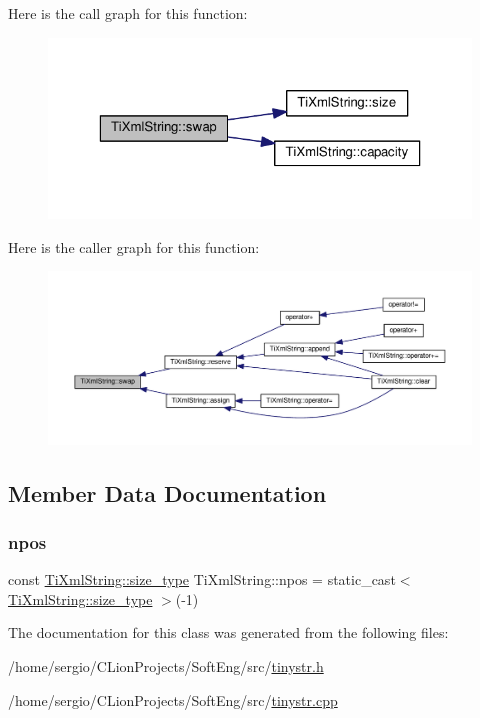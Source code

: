Here is the call graph for this function\+:
\nopagebreak
\begin{figure}[H]
\begin{center}
\leavevmode
\includegraphics[width=323pt]{class_ti_xml_string_aa392cbc180752a79f007f4f9280c7762_cgraph}
\end{center}
\end{figure}
Here is the caller graph for this function\+:
\nopagebreak
\begin{figure}[H]
\begin{center}
\leavevmode
\includegraphics[width=350pt]{class_ti_xml_string_aa392cbc180752a79f007f4f9280c7762_icgraph}
\end{center}
\end{figure}


\subsection{Member Data Documentation}
\mbox{\label{class_ti_xml_string_a8f4422d227088dc7bec96f479b275d0a}} 
\subsubsection{\texorpdfstring{npos}{npos}}
{\footnotesize\ttfamily const \hyperlink{class_ti_xml_string_abeb2c1893a04c17904f7c06546d0b971}{Ti\+Xml\+String\+::size\+\_\+type} Ti\+Xml\+String\+::npos = static\+\_\+cast$<$ \hyperlink{class_ti_xml_string_abeb2c1893a04c17904f7c06546d0b971}{Ti\+Xml\+String\+::size\+\_\+type} $>$(-\/1)\hspace{0.3cm}{\ttfamily [static]}}



The documentation for this class was generated from the following files\+:\begin{DoxyCompactItemize}
\item 
/home/sergio/\+C\+Lion\+Projects/\+Soft\+Eng/src/\hyperlink{tinystr_8h}{tinystr.\+h}\item 
/home/sergio/\+C\+Lion\+Projects/\+Soft\+Eng/src/\hyperlink{tinystr_8cpp}{tinystr.\+cpp}\end{DoxyCompactItemize}
